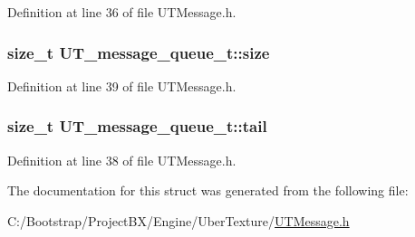 Definition at line 36 of file UTMessage.h.\hypertarget{struct_u_t__message__queue__t_a2ce94aaf9516409f8bdce88734cec4c}{
\subsubsection[{size}]{\setlength{\rightskip}{0pt plus 5cm}size\_\-t {\bf UT\_\-message\_\-queue\_\-t::size}}}
\label{struct_u_t__message__queue__t_a2ce94aaf9516409f8bdce88734cec4c}




Definition at line 39 of file UTMessage.h.\hypertarget{struct_u_t__message__queue__t_c503cec4378801aa04d045402b7056d5}{
\subsubsection[{tail}]{\setlength{\rightskip}{0pt plus 5cm}size\_\-t {\bf UT\_\-message\_\-queue\_\-t::tail}}}
\label{struct_u_t__message__queue__t_c503cec4378801aa04d045402b7056d5}




Definition at line 38 of file UTMessage.h.

The documentation for this struct was generated from the following file:\begin{CompactItemize}
\item 
C:/Bootstrap/ProjectBX/Engine/UberTexture/\hyperlink{_u_t_message_8h}{UTMessage.h}\end{CompactItemize}
